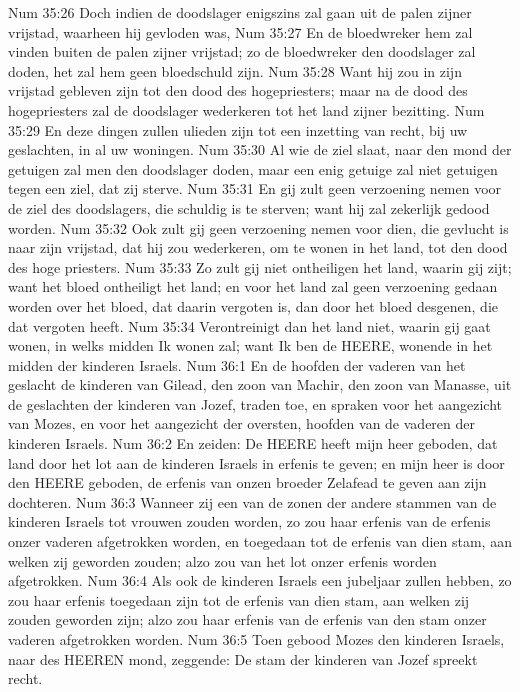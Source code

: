 Num 35:26  Doch indien de doodslager enigszins zal gaan uit de palen zijner vrijstad, waarheen hij gevloden was,
Num 35:27  En de bloedwreker hem zal vinden buiten de palen zijner vrijstad; zo de bloedwreker den doodslager zal doden, het zal hem geen bloedschuld zijn.
Num 35:28  Want hij zou in zijn vrijstad gebleven zijn tot den dood des hogepriesters; maar na de dood des hogepriesters zal de doodslager wederkeren tot het land zijner bezitting.
Num 35:29  En deze dingen zullen ulieden zijn tot een inzetting van recht, bij uw geslachten, in al uw woningen.
Num 35:30  Al wie de ziel slaat, naar den mond der getuigen zal men den doodslager doden, maar een enig getuige zal niet getuigen tegen een ziel, dat zij sterve.
Num 35:31  En gij zult geen verzoening nemen voor de ziel des doodslagers, die schuldig is te sterven; want hij zal zekerlijk gedood worden.
Num 35:32  Ook zult gij geen verzoening nemen voor dien, die gevlucht is naar zijn vrijstad, dat hij zou wederkeren, om te wonen in het land, tot den dood des hoge priesters.
Num 35:33  Zo zult gij niet ontheiligen het land, waarin gij zijt; want het bloed ontheiligt het land; en voor het land zal geen verzoening gedaan worden over het bloed, dat daarin vergoten is, dan door het bloed desgenen, die dat vergoten heeft.
Num 35:34  Verontreinigt dan het land niet, waarin gij gaat wonen, in welks midden Ik wonen zal; want Ik ben de HEERE, wonende in het midden der kinderen Israels.
Num 36:1  En de hoofden der vaderen van het geslacht de kinderen van Gilead, den zoon van Machir, den zoon van Manasse, uit de geslachten der kinderen van Jozef, traden toe, en spraken voor het aangezicht van Mozes, en voor het aangezicht der oversten, hoofden van de vaderen der kinderen Israels.
Num 36:2  En zeiden: De HEERE heeft mijn heer geboden, dat land door het lot aan de kinderen Israels in erfenis te geven; en mijn heer is door den HEERE geboden, de erfenis van onzen broeder Zelafead te geven aan zijn dochteren.
Num 36:3  Wanneer zij een van de zonen der andere stammen van de kinderen Israels tot vrouwen zouden worden, zo zou haar erfenis van de erfenis onzer vaderen afgetrokken worden, en toegedaan tot de erfenis van dien stam, aan welken zij geworden zouden; alzo zou van het lot onzer erfenis worden afgetrokken.
Num 36:4  Als ook de kinderen Israels een jubeljaar zullen hebben, zo zou haar erfenis toegedaan zijn tot de erfenis van dien stam, aan welken zij zouden geworden zijn; alzo zou haar erfenis van de erfenis van den stam onzer vaderen afgetrokken worden.
Num 36:5  Toen gebood Mozes den kinderen Israels, naar des HEEREN mond, zeggende: De stam der kinderen van Jozef spreekt recht.

